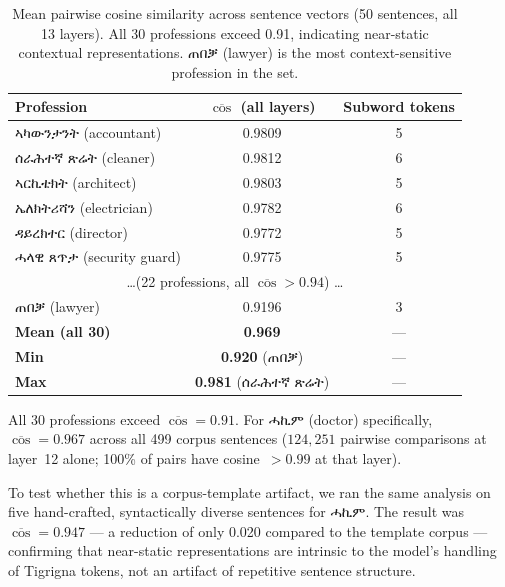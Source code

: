 \documentclass[11pt,a4paper]{article}
\begin{document}
\begin{table}[h]
\centering
\small
\begin{tabular}{lcc}
\toprule
\textbf{Profession} & \textbf{$\overline{\cos}$ (all layers)} & \textbf{Subword tokens} \\
\midrule
{\ethiopicfont ኣካውንታንት}  (accountant)    & 0.9809 & 5 \\
{\ethiopicfont ሰራሕተኛ ጽሬት} (cleaner)      & 0.9812 & 6 \\
{\ethiopicfont ኣርኪቴክት}   (architect)     & 0.9803 & 5 \\
{\ethiopicfont ኤለክትሪሻን}  (electrician)   & 0.9782 & 6 \\
{\ethiopicfont ዳይረክተር}   (director)      & 0.9772 & 5 \\
{\ethiopicfont ሓላዊ ጸጥታ}  (security guard) & 0.9775 & 5 \\
\multicolumn{3}{c}{\ldots (22 professions, all $\overline{\cos} > 0.94$) \ldots} \\
{\ethiopicfont ጠበቓ}      (lawyer)        & 0.9196 & 3 \\
\midrule
\textbf{Mean (all 30)}   & \textbf{0.969} & --- \\
\textbf{Min}             & \textbf{0.920} ({\ethiopicfont ጠበቓ}) & --- \\
\textbf{Max}             & \textbf{0.981} ({\ethiopicfont ሰራሕተኛ ጽሬት}) & --- \\
\bottomrule
\end{tabular}
\caption{Mean pairwise cosine similarity across sentence vectors (50 sentences,
all 13 layers). All 30 professions exceed 0.91, indicating near-static
contextual representations. {\ethiopicfont ጠበቓ} (lawyer) is the most
context-sensitive profession in the set.}
\label{tab:mean_cos}
\end{table}

All 30 professions exceed $\overline{\cos} = 0.91$. For {\ethiopicfont ሓኪም} (doctor)
specifically, $\overline{\cos} = 0.967$ across all 499 corpus sentences
($124{,}251$ pairwise comparisons at layer~12 alone; 100\% of pairs have
cosine~$> 0.99$ at that layer).

To test whether this is a corpus-template artifact, we ran the same analysis
on five hand-crafted, syntactically diverse sentences for {\ethiopicfont ሓኪም}.
The result was $\overline{\cos} = 0.947$ — a reduction of only 0.020 compared
to the template corpus — confirming that near-static representations are
intrinsic to the model's handling of Tigrigna tokens, not an artifact of
repetitive sentence structure.
\end{document}
